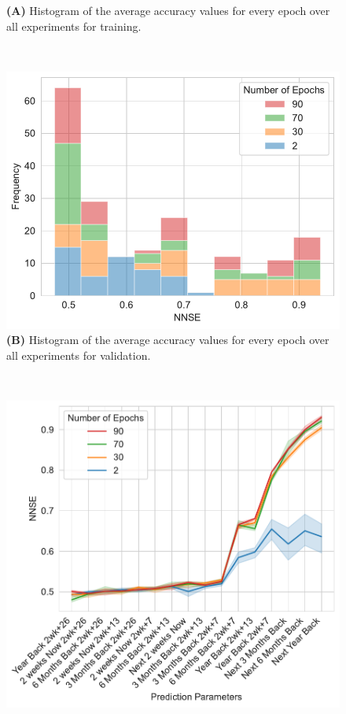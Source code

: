 \documentclass[utf8]{FrontiersinVancouver} %
\begin{document}
\begin{figure}[p]
{\begin{center}
\begin{minipage}[t]{0.49\textwidth}
        {\bf (A)} Histogram of the average accuracy values for every epoch over all experiments for training.
     \end{minipage}
  \ \
     \begin{minipage}[t]{0.49\textwidth}
        \includegraphics[width=1.0\linewidth]{images/frequency_nnse_histogram_stacked_df_validation}
        {\bf (B)} Histogram of the average accuracy values for every epoch over all experiments for validation.
     \end{minipage}
  \ \
     \begin{minipage}[t]{0.49\textwidth}
        \includegraphics[width=1.0\linewidth]{images/NNSE-all-epochs-training}

\end{minipage}
\end{center}}
\end{figure}
\end{document}
